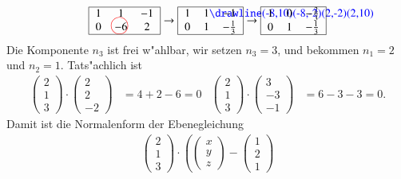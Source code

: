 \begin{beispiel}
\begin{align*}
\begin{tabular}{|>{$}c<{$}>{$}c<{$}>{$}c<{$}|}
\hline
1&1&-1\\
0&-6%
\begin{picture}(0,0)%
\color{red}\put(-7,4){\circle{15}}
\end{picture}%
&2\\
\hline
\end{tabular}
\rightarrow
\begin{tabular}{|>{$}c<{$}>{$}c<{$}>{$}c<{$}|}
\hline
1&1%
\begin{picture}(0,0)
\color{blue}\drawline(-8,10)(-8,-2)(2,-2)(2,10)
\end{picture}%
&-1\\
0&1&-\frac13\\
\hline
\end{tabular}
\rightarrow
\begin{tabular}{|>{$}c<{$}>{$}c<{$}>{$}c<{$}|}
\hline
1&0&-\frac23\\
0&1&-\frac13\\
\hline
\end{tabular}
\end{align*}
Die Komponente $n_3$ ist frei w"ahlbar, wir setzen $n_3=3$, und bekommen
$n_1=2$ und $n_2=1$.
Tats"achlich ist
\begin{align*}
\begin{pmatrix}2\\1\\3\end{pmatrix}
\cdot
\begin{pmatrix}2\\2\\-2\end{pmatrix}
&=4+2-6=0
&
\begin{pmatrix}2\\1\\3\end{pmatrix}
\cdot
\begin{pmatrix}3\\-3\\-1\end{pmatrix}
&=6-3-3=0.
\end{align*}
Damit ist die Normalenform der Ebenegleichung
\begin{align}
\begin{pmatrix}2\\1\\3\end{pmatrix}\cdot\left(
\begin{pmatrix}x\\y\\z\end{pmatrix} - \begin{pmatrix}1\\2\\1\end{pmatrix}

\end{align}
\end{beispiel}

